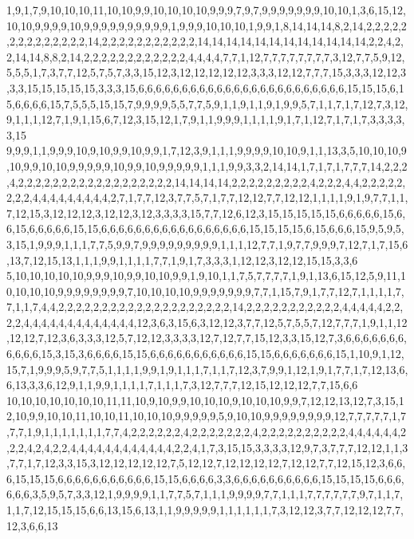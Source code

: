 1,9,1,7,9,10,10,10,11,10,10,9,9,10,10,10,10,9,9,9,7,9,7,9,9,9,9,9,9,9,10,10,1,3,6,15,12,10,10,9,9,9,9,10,9,9,9,9,9,9,9,9,9,9,1,9,9,9,10,10,10,1,9,9,1,8,14,14,14,8,2,14,2,2,2,2,2,2,2,2,2,2,2,2,2,2,14,2,2,2,2,2,2,2,2,2,2,2,14,14,14,14,14,14,14,14,14,14,14,14,2,2,4,2,2,14,14,8,8,2,14,2,2,2,2,2,2,2,2,2,2,2,2,4,4,4,4,7,7,1,12,7,7,7,7,7,7,7,7,3,12,7,7,5,9,12,5,5,5,1,7,3,7,7,12,5,7,5,7,3,3,15,12,3,12,12,12,12,12,3,3,3,12,12,7,7,7,15,3,3,3,12,12,3,3,3,15,15,15,15,15,3,3,3,15,6,6,6,6,6,6,6,6,6,6,6,6,6,6,6,6,6,6,6,6,6,6,6,6,15,15,15,6,15,6,6,6,6,15,7,5,5,5,15,15,7,9,9,9,9,5,5,7,7,5,9,1,1,9,1,1,9,1,9,9,5,7,1,1,7,1,7,12,7,3,12,9,1,1,1,12,7,1,9,1,15,6,7,12,3,15,12,1,7,9,1,1,9,9,9,1,1,1,1,9,1,7,1,12,7,1,7,1,7,3,3,3,3,3,15
9,9,9,1,1,9,9,9,10,9,10,9,9,10,9,9,1,7,12,3,9,1,1,1,9,9,9,9,10,10,9,1,1,13,3,5,10,10,10,9,10,9,9,10,10,9,9,9,9,9,10,9,9,10,9,9,9,9,9,1,1,1,9,9,3,3,2,14,14,1,7,1,7,1,7,7,7,14,2,2,2,4,2,2,2,2,2,2,2,2,2,2,2,2,2,2,2,2,2,2,14,14,14,14,2,2,2,2,2,2,2,2,2,4,2,2,2,4,4,2,2,2,2,2,2,2,2,4,4,4,4,4,4,4,4,4,2,7,1,7,7,12,3,7,7,5,7,1,7,7,12,12,7,7,12,12,1,1,1,1,9,1,9,7,7,1,1,7,12,15,3,12,12,12,3,12,12,3,12,3,3,3,3,15,7,7,12,6,12,3,15,15,15,15,15,6,6,6,6,6,15,6,6,15,6,6,6,6,6,15,15,6,6,6,6,6,6,6,6,6,6,6,6,6,6,6,6,6,15,15,15,15,6,15,6,6,6,15,9,5,9,5,3,15,1,9,9,9,1,1,1,7,7,5,9,9,7,9,9,9,9,9,9,9,9,9,1,1,1,12,7,7,1,9,7,7,9,9,9,7,12,7,1,7,15,6,13,7,12,15,13,1,1,1,9,9,1,1,1,1,7,7,1,9,1,7,3,3,3,1,12,12,3,12,12,15,15,3,3,6
5,10,10,10,10,10,9,9,9,10,9,9,10,10,9,9,1,9,10,1,1,7,5,7,7,7,7,1,9,1,13,6,15,12,5,9,11,10,10,10,10,9,9,9,9,9,9,9,9,7,10,10,10,10,9,9,9,9,9,9,9,7,7,1,15,7,9,1,7,7,12,7,1,1,1,1,7,7,1,1,7,4,4,2,2,2,2,2,2,2,2,2,2,2,2,2,2,2,2,2,2,2,2,14,2,2,2,2,2,2,2,2,2,2,2,4,4,4,4,4,2,2,2,2,4,4,4,4,4,4,4,4,4,4,4,4,4,12,3,6,3,15,6,3,12,12,3,7,7,12,5,7,5,5,7,12,7,7,7,1,9,1,1,12,12,12,7,12,3,6,3,3,3,12,5,7,12,12,3,3,3,3,12,7,12,7,7,15,12,3,3,15,12,7,3,6,6,6,6,6,6,6,6,6,6,6,15,3,15,3,6,6,6,6,15,15,6,6,6,6,6,6,6,6,6,6,6,15,15,6,6,6,6,6,6,6,15,1,10,9,1,12,15,7,1,9,9,9,5,9,7,7,5,1,1,1,1,9,9,1,9,1,1,1,7,1,1,7,12,3,7,9,9,1,12,1,9,1,7,7,1,7,12,13,6,6,13,3,3,6,12,9,1,1,9,9,1,1,1,1,7,1,1,1,7,3,12,7,7,7,12,15,12,12,12,7,7,15,6,6
10,10,10,10,10,10,10,11,11,10,9,10,9,9,10,10,10,9,10,10,10,9,9,7,12,12,13,12,7,3,15,12,10,9,9,10,10,11,10,10,11,10,10,10,9,9,9,9,9,5,9,10,10,9,9,9,9,9,9,9,9,12,7,7,7,7,7,1,7,7,7,1,9,1,1,1,1,1,1,1,7,7,4,2,2,2,2,2,2,4,2,2,2,2,2,2,2,4,2,2,2,2,2,2,2,2,2,2,4,4,4,4,4,4,2,2,2,4,2,4,2,2,4,4,4,4,4,4,4,4,4,4,4,4,2,2,4,1,7,3,15,15,3,3,3,3,12,9,7,3,7,7,7,12,12,1,1,3,7,7,1,7,12,3,3,15,3,12,12,12,12,12,7,5,12,12,7,12,12,12,12,7,12,12,7,7,12,15,12,3,6,6,6,15,15,15,6,6,6,6,6,6,6,6,6,6,6,15,15,6,6,6,6,3,3,6,6,6,6,6,6,6,6,6,6,15,15,15,15,6,6,6,6,6,6,3,5,9,5,7,3,3,12,1,9,9,9,9,1,1,7,7,5,7,1,1,1,9,9,9,9,7,7,1,1,1,7,7,7,7,7,7,9,7,1,1,7,1,1,7,12,15,15,15,6,6,13,15,6,13,1,1,9,9,9,9,9,1,1,1,1,1,1,7,3,12,12,3,7,7,12,12,12,7,7,12,3,6,6,13
